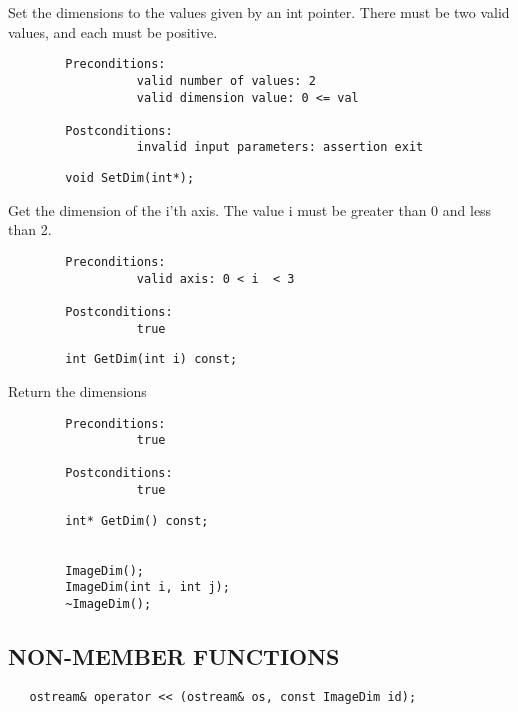            Set the dimensions to the values given by an int pointer. There
           must be two valid values, and each must be positive.
\small\begin{verbatim}
        Preconditions:
                  valid number of values: 2
                  valid dimension value: 0 <= val
          
        Postconditions:
                  invalid input parameters: assertion exit
\end{verbatim}\normalsize          
\begin{verbatim}
        void SetDim(int*);
\end{verbatim}

           Get the dimension of the i'th axis. The value i must be
           greater than 0 and less than 2.
\small\begin{verbatim}
        Preconditions:
                  valid axis: 0 < i  < 3
          
        Postconditions:
                  true
\end{verbatim}\normalsize          
\begin{verbatim}
        int GetDim(int i) const;
\end{verbatim}

           Return the dimensions
\small\begin{verbatim}
        Preconditions:
                  true
          
        Postconditions:
                  true
\end{verbatim}\normalsize          
\begin{verbatim}
        int* GetDim() const;


        ImageDim();
        ImageDim(int i, int j);
        ~ImageDim();
\end{verbatim}

\subsection*{NON-MEMBER FUNCTIONS}

\begin{verbatim}
   ostream& operator << (ostream& os, const ImageDim id);
\end{verbatim}
